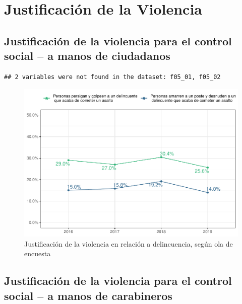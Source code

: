 \documentclass[
  12pt,
  openany]{book}
\begin{document}
\hypertarget{justificaciuxf3n-de-la-violencia}{%
\chapter{Justificación de la Violencia}\label{justificaciuxf3n-de-la-violencia}}

\hypertarget{justificaciuxf3n-de-la-violencia-para-el-control-social-a-manos-de-ciudadanos}{%
\section{Justificación de la violencia para el control social -- a manos de ciudadanos}\label{justificaciuxf3n-de-la-violencia-para-el-control-social-a-manos-de-ciudadanos}}

\begin{verbatim}
## 2 variables were not found in the dataset: f05_01, f05_02
\end{verbatim}

\begin{figure}
\centering
\includegraphics{reporte-elsoc_files/figure-latex/just-vio-ola-1.pdf}
\caption{\label{fig:just-vio-ola}Justificación de la violencia en relación a delincuencia, según ola de encuesta}
\end{figure}

\hypertarget{justificaciuxf3n-de-la-violencia-para-el-control-social-a-manos-de-carabineros}{%
\section{Justificación de la violencia para el control social -- a manos de carabineros}\label{justificaciuxf3n-de-la-violencia-para-el-control-social-a-manos-de-carabineros}}
\end{document}

